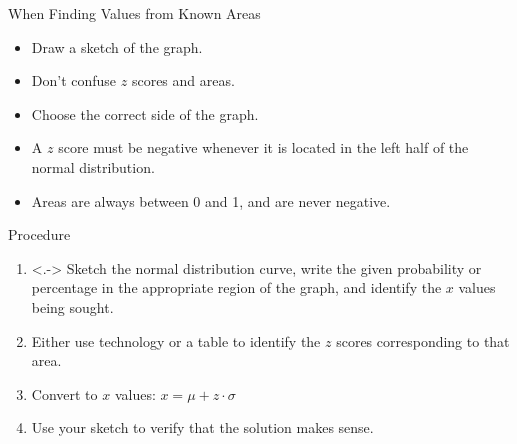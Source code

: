\documentclass{beamer}
\begin{document}
\begin{frame}
\begin{block}{When Finding Values from Known Areas}
\begin{itemize}[<+- | alert@+>]
\item Draw a sketch of the graph.
\item Don't confuse $z$ scores and areas.
\item Choose the correct side of the graph.
\item A $z$ score must be negative whenever it is located in the left half of the normal distribution.
\item Areas are always between 0 and 1, and are never negative.
\end{itemize}
\end{block}

\onslide<+->
\begin{block}{Procedure}
\begin{enumerate}[<+- | alert@+>]
\item<.-> Sketch the normal distribution curve, write the given probability or percentage in the appropriate region of the graph, and identify the $x$ values being sought.
\item Either use technology or a table to identify the $z$ scores corresponding to that area.
\item Convert to $x$ values: $x=\mu + z\cdot\sigma$
\item Use your sketch to verify that the solution makes sense.
\end{enumerate}
\end{block}
\end{frame}
\end{document}
